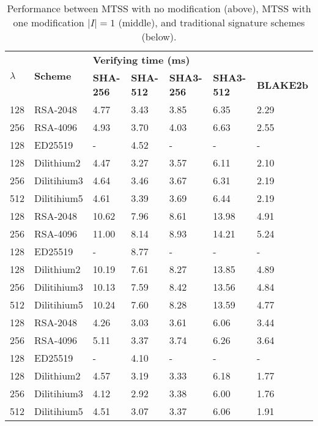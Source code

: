 \begin{table}[ht]
\centering
\small
\begin{tabular}{|rllllll|}
\hline
\multicolumn{1}{|l|}{\multirow{2}{*}{\textbf{$\lambda$}}} &
  \multicolumn{1}{l|}{\multirow{2}{*}{\textbf{Scheme}}} &
  \multicolumn{5}{l|}{\textbf{Verifying time (ms)}} \\ \cline{3-7} 
\multicolumn{1}{|l|}{} &
  \multicolumn{1}{l|}{} &
  \multicolumn{1}{l|}{\textbf{SHA-256}} &
  \multicolumn{1}{l|}{\textbf{SHA-512}} &
  \multicolumn{1}{l|}{\textbf{SHA3-256}} &
  \multicolumn{1}{l|}{\textbf{SHA3-512}} &
  \multicolumn{1}{l|}{\textbf{BLAKE2b}} \\ \hline
128 & RSA-2048    & 4.77  & 3.43 & 3.85 & 6.35  & 2.29 \\
256 & RSA-4096    & 4.93  & 3.70 & 4.03 & 6.63  & 2.55 \\
128 & ED25519     & -     & 4.52 & -    & -     & -    \\
128 & Dilithium2  & 4.47  & 3.27 & 3.57 & 6.11  & 2.10 \\
256 & Dilitihium3 & 4.64  & 3.46 & 3.67 & 6.31  & 2.19 \\
512 & Dilitihium5 & 4.61  & 3.39 & 3.69 & 6.44  & 2.19 \\
\hline
128 & RSA-2048    & 10.62 & 7.96 & 8.61 & 13.98 & 4.91 \\
256 & RSA-4096    & 11.00 & 8.14 & 8.93 & 14.21 & 5.24 \\
128 & ED25519     & -     & 8.77 & -    & -     & -    \\
128 & Dilithium2  & 10.19 & 7.61 & 8.27 & 13.85 & 4.89 \\
256 & Dilitihium3 & 10.13 & 7.59 & 8.42 & 13.56 & 4.84 \\
512 & Dilitihium5 & 10.24 & 7.60 & 8.28 & 13.59 & 4.77 \\
\hline
128 & RSA-2048    & 4.26  & 3.03 & 3.61 & 6.06  & 3.44 \\
256 & RSA-4096    & 5.11  & 3.37 & 3.74 & 6.26  & 3.64 \\
128 & ED25519     & -     & 4.10 & -    & -     & -    \\
128 & Dilithium2  & 4.57  & 3.19 & 3.33 & 6.18  & 1.77 \\
256 & Dilitihium3 & 4.12  & 2.92 & 3.38 & 6.00  & 1.76 \\
512 & Dilitihium5 & 4.51  & 3.07 & 3.37 & 6.06  & 1.91 \\
\hline
\end{tabular}
\caption{Performance between MTSS with no modification (above), MTSS with one modification $|I| = 1$ (middle), and traditional signature schemes (below).}
\label{table:performance-verify-traditional-mtss}
\end{table}